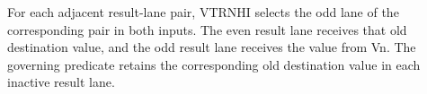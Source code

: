For each adjacent result-lane pair, VTRNHI selects the odd lane of the
corresponding pair in both inputs.  The even result lane receives that old
destination value, and the odd result lane receives the value from Vn.  The
governing predicate retains the corresponding old destination value in each
inactive result lane.
